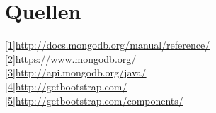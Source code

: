 \documentclass[a4paper,12pt]{scrreprt}
\begin{document}
\chapter{Quellen}
\href{http://docs.mongodb.org/manual/reference/}{[1]http://docs.mongodb.org/manual/reference/}\\
\href{https://www.mongodb.org/}{[2]https://www.mongodb.org/}\\
\href{http://api.mongodb.org/java/}{[3]http://api.mongodb.org/java/}\\
\href{http://getbootstrap.com/}{[4]http://getbootstrap.com/}\\
\href{http://getbootstrap.com/components/}{[5]http://getbootstrap.com/components/}
\end{document}
